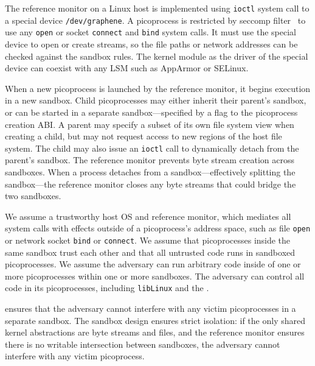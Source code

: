 The \sysname{} reference monitor on a Linux host
is implemented using {\tt ioctl} system call to a special device {\tt /dev/graphene}.
A picoprocess is restricted by seccomp filter~\citep{seccomp} to use any {\tt open} or socket {\tt connect} and {\tt bind} system calls.
It must use the \sysname{} special device to open or create streams,
so the file paths or network addresses can be checked against the sandbox rules.
The kernel module as the driver of the \sysname{} special device can coexist with any LSM such as AppArmor or SELinux.


When a new picoprocess is launched by the reference monitor, it begins execution in 
a new sandbox.  
Child picoprocesses may either inherit their parent's sandbox, 
or can be started in a separate sandbox---specified
by a flag to the picoprocess creation ABI.
A parent may specify a subset of its own file system view 
when creating a child, but may not request access to new regions of the 
host file system. 
The child may also issue an {\tt ioctl} call to 
dynamically detach from the parent's sandbox. The reference monitor prevents byte stream creation 
across sandboxes.
When a process detaches from a sandbox---effectively splitting the sandbox---the
reference monitor closes
any byte streams that could bridge the two sandboxes.

\vspace{5pt}
We assume  a trustworthy host OS and reference monitor,
which mediates all system calls with effects outside of a picoprocess's address space,
such as file {\tt open} or network socket {\tt bind} or {\tt connect}.
We assume that picoprocesses inside the same sandbox trust each other and that all untrusted code runs in sandboxed picoprocesses.
We assume the adversary can run arbitrary code inside of
one or more picoprocesses within one or more sandboxes.
The adversary can control all code in its
picoprocesses, including {\tt libLinux} and the \pal{}. 

\sysname{} ensures that %
the adversary cannot interfere with any victim picoprocesses
in a separate sandbox.  
The \sysname{} sandbox design ensures strict isolation: 
if the only shared kernel abstractions are byte streams and files, 
and the reference monitor ensures
there is no writable intersection between sandboxes,
the adversary cannot interfere with any victim picoprocess.


